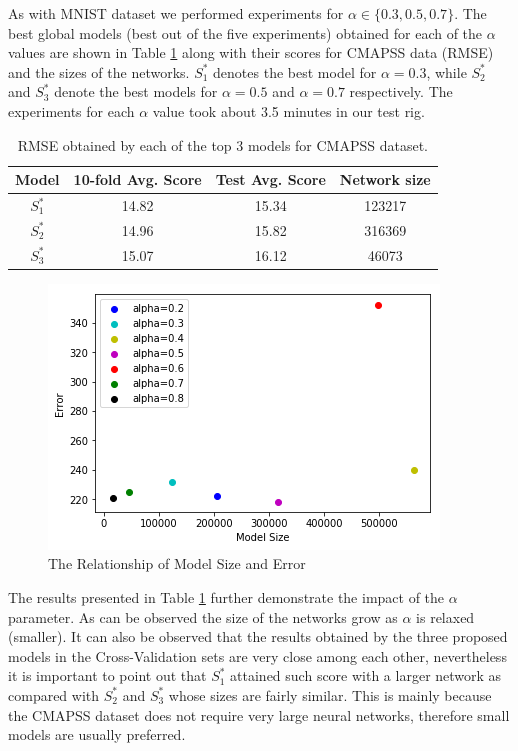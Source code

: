 \documentclass[journal]{IEEEtran}
\begin{document}
As with MNIST dataset we performed experiments for $\alpha \in \{0.3, 0.5, 0.7\}$. The best global models (best out of the five experiments) obtained for each of the $\alpha$ values are shown in Table \ref{table:avg_rmse_cmapss} along with their scores for CMAPSS data (RMSE) and the sizes of the networks. $S^*_1$ denotes the best model for $\alpha = 0.3$, while $S^*_2$ and $S^*_3$ denote the best models for $\alpha = 0.5$ and $\alpha = 0.7$ respectively. The experiments for each $\alpha$ value took about 3.5 minutes in our test rig.

\begin{table}[!htb]
\begin{center}
\begin{tabular}{| c | c | c | c |}
\hline
Model & 10-fold Avg. Score & Test Avg. Score & Network size\\
\hline
$S^*_1$ & 14.82 & 15.34 & 123217\\
$S^*_2$ & 14.96 & 15.82 & 316369\\
$S^*_3$ & 15.07 & 16.12 & 46073\\
\hline
\end{tabular}
\end{center}
\caption{RMSE obtained by each of the top 3 models for CMAPSS dataset.}
\label{table:avg_rmse_cmapss}
\end{table}
\begin{figure}[H]
	\begin{center}
		\centering
		\includegraphics[scale=0.55]{cmapss_scatter.png}
		\caption{The Relationship of Model Size and Error}
		\label{fig:cmapss_scatter}
	\end{center}
\end{figure}

The results presented in Table \ref{table:avg_rmse_cmapss} further demonstrate the impact of the $\alpha$ parameter. As can be observed the size of the networks grow as $\alpha$ is relaxed (smaller). It can also be observed that the results obtained by the three proposed models in the Cross-Validation sets are very close among each other, nevertheless it is important to point out that $S^*_1$ attained such score with a larger network as compared with $S^*_2$ and $S^*_3$ whose sizes are fairly similar. This is mainly because the CMAPSS dataset does not require very large neural networks, therefore small models are usually preferred. 
\end{document}
